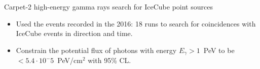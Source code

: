\begin{frame}{Carpet-2 high-energy gamma rays search for IceCube point sources}
\begin{itemize}
\item Used the events recorded in the 2016: 18 runs to search for coincidences with IceCube events in direction and time.
\item Constrain the potential flux of photons with energy $E_{\gamma} > 1$~PeV to be $< 5.4 \cdot 10^-5$~PeV/cm$^2$ with 95\% CL.
\end{itemize}
\end{frame}
